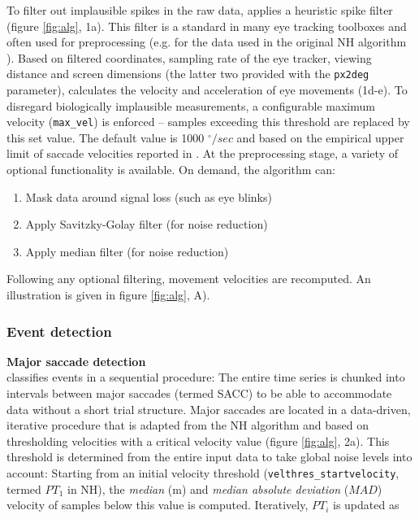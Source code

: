 To filter out implausible spikes in the raw data, \remodnav applies a heuristic spike filter \citep{stampe1993}
(figure \ref{fig:alg}, 1a). This filter is a standard in many eye tracking toolboxes and often used for preprocessing
(e.g. for the data used in the original NH algorithm \citep{Friedman2018}). Based on filtered coordinates, sampling
rate of the eye tracker, viewing distance and screen dimensions (the latter two provided with the \texttt{px2deg}
parameter), \remodnav calculates the velocity and acceleration of eye movements (1d-e). To disregard biologically
implausible measurements, a configurable maximum velocity (\texttt{max\_vel}) is enforced -- samples exceeding this
threshold are replaced by this set value. The default value is 1000 $^\circ/sec$ and based on the empirical upper
limit of saccade velocities reported in \cite{holmqvist2011eye}.
At the preprocessing stage, a variety of optional functionality is available. On demand, the algorithm can:
\begin{enumerate}
    \item Mask data around signal loss (such as eye blinks)
    \item Apply Savitzky-Golay filter (for noise reduction)
    \item Apply median filter (for noise reduction)
\end{enumerate}
Following any optional filtering, movement velocities are recomputed. An illustration is given in figure
\ref{fig:alg}, A).\\

\subsubsection*{Event detection}

\textbf{Major saccade detection}\\
\remodnav classifies events in a sequential procedure: The entire time series is chunked into intervals between
major saccades (termed SACC) to be able to accommodate
data without a short trial structure. Major saccades are located in a data-driven,
iterative procedure that is adapted from the NH algorithm and based on thresholding velocities with a critical
velocity value (figure \ref{fig:alg}, 2a). This threshold is determined from the entire input data to take global
noise levels into account: Starting from an initial velocity threshold
(\texttt{velthres\_\linebreak[0]startvelocity}, termed
$PT_1$ in NH), the \textit{median} (m) and \textit{median absolute deviation} ($MAD$) velocity of samples below this
value is computed. Iteratively, $PT_i$ is updated as

